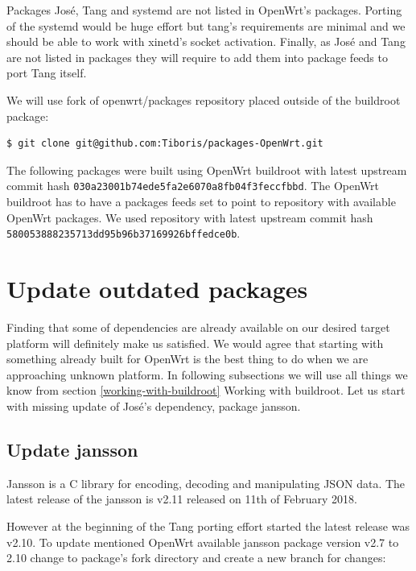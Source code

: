 Packages José, Tang and systemd are not listed in OpenWrt's packages.
Porting of the systemd would be huge effort but tang's requirements are minimal and we should be able to work with xinetd's socket activation.
Finally, as José and Tang are not listed in packages they will require to add them into package feeds to port Tang itself.

We will use fork of openwrt/packages repository placed outside of the buildroot package:
\begin{lstlisting}[columns=fixed,basicstyle=\ttfamily\footnotesize,tabsize=4,backgroundcolor=\color{yellow!10}]
$ git clone git@github.com:Tiboris/packages-OpenWrt.git
\end{lstlisting}

The following packages were built using OpenWrt buildroot with latest upstream commit hash {\tt 030a23001b74ede5fa2e6070a8fb04f3feccfbbd}.
The OpenWrt buildroot has to have a packages feeds set to point to repository with available OpenWrt packages.
We used repository with latest upstream commit hash {\tt 580053888235713dd95b96b37169926bffedce0b}.
\newpage


\section{Update outdated packages}

Finding that some of dependencies are already available on our desired target platform will definitely make us satisfied.
We would agree that starting with something already built for OpenWrt is the best thing to do when we are approaching unknown platform.
In following subsections we will use all things we know from section \ref{working-with-buildroot} Working with buildroot.
Let us start with missing update of José's dependency, package jansson.



\subsection{Update jansson}\label{jansson}
Jansson is a C library for encoding, decoding and manipulating JSON data.
The latest release of the jansson is v2.11 released on 11th of February 2018\cite{jansson}.

However at the beginning of the Tang porting effort started the latest release was v2.10.
To update mentioned OpenWrt available jansson package version v2.7 to 2.10 change to package's fork directory and create a new branch for changes:

